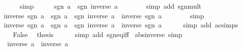 \begin{isabellebody}
\ \ \ \ \isamarkupfalse%
\ simp\isanewline
\ \ \isamarkupfalse%
\ \isamarkupfalse%
\ {\isachardoublequoteopen}sgn\ a\ {\isacharasterisk}{\kern0pt}\ sgn\ {\isacharparenleft}{\kern0pt}inverse\ a{\isacharparenright}{\kern0pt}\ {\isacharequal}{\kern0pt}\ {}{\isachardoublequoteclose}\isanewline
\ \ \ \ \isamarkupfalse%
\ {\isacharparenleft}{\kern0pt}simp\ add{\isacharcolon}{\kern0pt}\ sgn{\isacharunderscore}{\kern0pt}mult{\isacharparenright}{\kern0pt}\isanewline
\ \ \isamarkupfalse%
\ \isamarkupfalse%
\ {\isachardoublequoteopen}inverse\ {\isacharparenleft}{\kern0pt}sgn\ a{\isacharparenright}{\kern0pt}\ {\isacharasterisk}{\kern0pt}\ {\isacharparenleft}{\kern0pt}sgn\ a\ {\isacharasterisk}{\kern0pt}\ sgn\ {\isacharparenleft}{\kern0pt}inverse\ a{\isacharparenright}{\kern0pt}{\isacharparenright}{\kern0pt}\ {\isacharequal}{\kern0pt}\ inverse\ {\isacharparenleft}{\kern0pt}sgn\ a{\isacharparenright}{\kern0pt}\ {\isacharasterisk}{\kern0pt}\ {}{\isachardoublequoteclose}\isanewline
\ \ \ \ \isamarkupfalse%
\ simp\isanewline
\ \ \isamarkupfalse%
\ \isamarkupfalse%
\ {\isachardoublequoteopen}{\isacharparenleft}{\kern0pt}inverse\ {\isacharparenleft}{\kern0pt}sgn\ a{\isacharparenright}{\kern0pt}\ {\isacharasterisk}{\kern0pt}\ sgn\ a{\isacharparenright}{\kern0pt}\ {\isacharasterisk}{\kern0pt}\ sgn\ {\isacharparenleft}{\kern0pt}inverse\ a{\isacharparenright}{\kern0pt}\ {\isacharequal}{\kern0pt}\ inverse\ {\isacharparenleft}{\kern0pt}sgn\ a{\isacharparenright}{\kern0pt}{\isachardoublequoteclose}\isanewline
\ \ \ \ \isamarkupfalse%
\ {\isacharparenleft}{\kern0pt}simp\ add{\isacharcolon}{\kern0pt}\ ac{\isacharunderscore}{\kern0pt}simps{\isacharparenright}{\kern0pt}\isanewline
\ \ \isamarkupfalse%
\ False\ \isamarkupfalse%
\ {\isacharquery}{\kern0pt}thesis\isanewline
\ \ \ \ \isamarkupfalse%
\ {\isacharparenleft}{\kern0pt}simp\ add{\isacharcolon}{\kern0pt}\ sgn{\isacharunderscore}{\kern0pt}eq{\isacharunderscore}{\kern0pt}{}{\isacharunderscore}{\kern0pt}iff{\isacharparenright}{\kern0pt}\isanewline
{}\isamarkupfalse%
%
\endisatagproof
{\isafoldproof}%
%
\isadelimproof
\isanewline
%
\endisadelimproof
\isanewline
{}\isamarkupfalse%
\ abs{\isacharunderscore}{\kern0pt}inverse\ {\isacharbrackleft}{\kern0pt}simp{\isacharbrackright}{\kern0pt}{\isacharcolon}{\kern0pt}\isanewline
\ \ {\isachardoublequoteopen}{\isasymbar}inverse\ a{\isasymbar}\ {\isacharequal}{\kern0pt}\ inverse\ {\isasymbar}a{\isasymbar}{\isachardoublequoteclose}\isanewline

\end{isabellebody}

